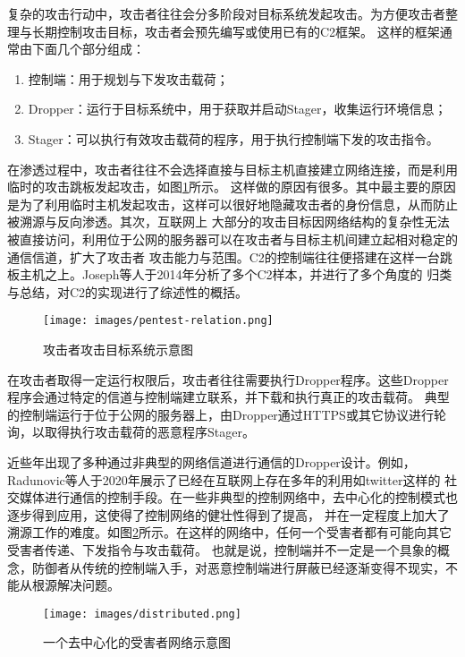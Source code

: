 复杂的攻击行动中，攻击者往往会分多阶段对目标系统发起攻击。为方便攻击者整理与长期控制攻击目标，攻击者会预先编写或使用已有的C2框架。
这样的框架通常由下面几个部分组成：

\begin{enumerate}
    \item 控制端：用于规划与下发攻击载荷；
    \item Dropper：运行于目标系统中，用于获取并启动Stager，收集运行环境信息；
    \item Stager：可以执行有效攻击载荷的程序，用于执行控制端下发的攻击指令。
\end{enumerate}

在渗透过程中，攻击者往往不会选择直接与目标主机直接建立网络连接，而是利用临时的攻击跳板发起攻击，如图\ref{FIG-pentest-relation}所示。
这样做的原因有很多。其中最主要的原因是为了利用临时主机发起攻击，这样可以很好地隐藏攻击者的身份信息，从而防止被溯源与反向渗透。其次，互联网上
大部分的攻击目标因网络结构的复杂性无法被直接访问，利用位于公网的服务器可以在攻击者与目标主机间建立起相对稳定的通信信道，扩大了攻击者
攻击能力与范围。C2的控制端往往便搭建在这样一台跳板主机之上。Joseph等人\cite{C2Review}于2014年分析了多个C2样本，并进行了多个角度的
归类与总结，对C2的实现进行了综述性的概括。

\begin{figure}[h]
    \centering
    \texttt{[image: images/pentest-relation.png]}
    \caption{攻击者攻击目标系统示意图}
    \label{FIG-pentest-relation}
\end{figure}

在攻击者取得一定运行权限后，攻击者往往需要执行Dropper程序。这些Dropper程序会通过特定的信道与控制端建立联系，并下载和执行真正的攻击载荷。
典型的控制端运行于位于公网的服务器上，由Dropper通过HTTPS或其它协议进行轮询，以取得执行攻击载荷的恶意程序Stager。

近些年出现了多种通过非典型的网络信道进行通信的Dropper设计。例如，Radunovic等人于2020年展示了已经在互联网上存在多年的利用如twitter这样的
社交媒体进行通信的控制手段\cite{SocmediaCC}。在一些非典型的控制网络中，去中心化的控制模式也逐步得到应用，这使得了控制网络的健壮性得到了提高，
并在一定程度上加大了溯源工作的难度。如图\ref{FIG-distributed}所示。在这样的网络中，任何一个受害者都有可能向其它受害者传递、下发指令与攻击载荷。
也就是说，控制端并不一定是一个具象的概念，防御者从传统的控制端入手，对恶意控制端进行屏蔽已经逐渐变得不现实，不能从根源解决问题。

\begin{figure}[h]
    \centering
    \texttt{[image: images/distributed.png]}
    \caption{一个去中心化的受害者网络示意图}
    \label{FIG-distributed}
\end{figure}

